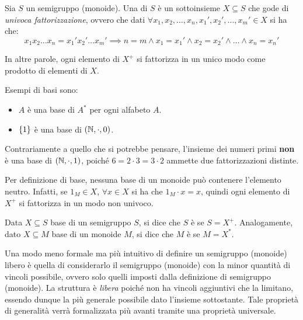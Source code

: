 \begin{definition}
  Sia \(S\) un semigruppo (monoide).
  Una  di \(S\) è un sottoinsieme \(X \subseteq S\) che gode di \emph{univoca fattorizzazione}, ovvero che dati \(\forall x_1,x_2,\ldots,x_n,x_1',x_2',\ldots,x_m' \in X\) si ha che:
  \[x_1 x_2 \ldots x_n = x_1' x_2' \ldots x_m' \implies n=m \land x_1 = x_1' \land x_2 = x_2' \land \ldots \land x_n = x_n'\]
\end{definition}
In altre parole, ogni elemento di \(X^{+}\) si fattorizza in un unico modo come prodotto di elementi di \(X\).

\begin{example}
  Esempi di basi sono:
  \begin{itemize}
    \item \(A\) è una base di \(A^*\) per ogni alfabeto \(A\).
    \item \(\set{1}\) è una base di \((\mathbb{N}, \cdot, 0)\).
  \end{itemize}
  Contrariamente a quello che si potrebbe pensare, l'insieme dei numeri primi \textbf{non} è una base di \((\mathbb{N}, \cdot, 1)\), poiché \(6 = 2 \cdot 3 = 3 \cdot 2\) ammette due fattorizzazioni distinte.
\end{example}

\begin{note}\label{note:no_neutral_in_base}
  Per definizione di base, nessuna base di un monoide può contenere l'elemento neutro.
  Infatti, se \(1_M \in X\), \(\forall x \in X\) si ha che \(1_M \cdot x = x\), quindi ogni elemento di \(X^{+}\) si fattorizza in un modo non univoco.
\end{note}

\begin{definition}
  Data \(X \subseteq S\) base di un semigruppo \(S\), si dice che \(S\) è  se \(S = X^{+}\).
  Analogamente, dato \(X \subseteq M\) base di un monoide \(M\), si dice che \(M\) è  se \(M = X^{*}\).
\end{definition}
Una modo meno formale ma più intuitivo di definire un semigruppo (monoide) libero è quella di considerarlo il semigruppo (monoide) con la minor quantità di vincoli possibile, ovvero solo quelli imposti dalla definizione di semigruppo (monoide).
La struttura è \emph{libera} poiché non ha vincoli aggiuntivi che la limitano, essendo dunque la più generale possibile dato l'insieme sottostante.
Tale proprietà di generalità verrà formalizzata più avanti tramite una proprietà universale.

